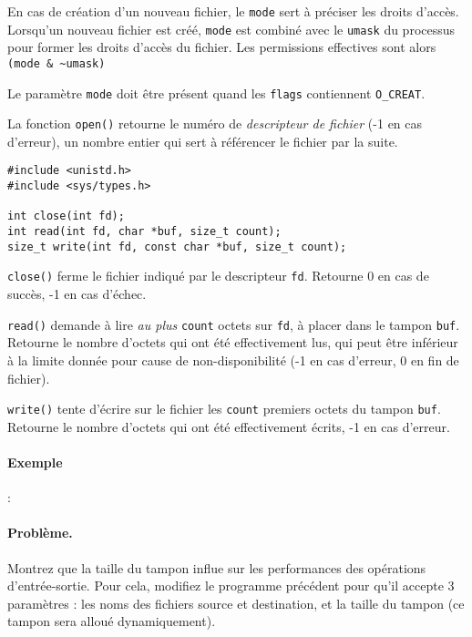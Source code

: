En cas de création d'un nouveau fichier, le \texttt{mode} sert à
préciser les droits d'accès.  Lorsqu'un nouveau fichier est créé,
\texttt{mode} est combiné avec le \texttt{umask} du processus pour
former les droits d'accès du fichier. Les permissions effectives sont
alors \verb/(mode & ~umask)/ 

Le paramètre \texttt{mode}
doit être présent quand les \texttt{flags} contiennent
\texttt{O\_CREAT}.

La fonction \texttt{open()}
retourne  le numéro de \emph{descripteur de fichier} (-1 en cas d'erreur),
un nombre entier qui sert à référencer le fichier par la suite. 



\extrait
\begin{lstlisting}
#include <unistd.h>
#include <sys/types.h>

int close(int fd);
int read(int fd, char *buf, size_t count);
size_t write(int fd, const char *buf, size_t count);
\end{lstlisting}


\texttt{close()} ferme le fichier indiqué par le descripteur
\texttt{fd}.  Retourne 0 en cas de succès, -1 en cas d'échec.

\texttt{read()} demande à lire \emph{au plus} \texttt{count} octets
sur \texttt{fd}, à placer dans le tampon \texttt{buf}. Retourne le
nombre d'octets qui ont été effectivement lus, qui peut être inférieur
à la limite donnée pour cause de non-disponibilité (-1 en cas
d'erreur, 0 en fin de fichier).

\texttt{write()} tente d'écrire sur
le fichier les \texttt{count} premiers octets du tampon
\texttt{buf}. Retourne le nombre d'octets qui ont été effectivement
écrits, -1 en cas d'erreur.

\paragraph*{Exemple} :

\source



\paragraph*{Problème.} Montrez que la taille du tampon influe sur les
performances des opérations d'entrée-sortie.  Pour cela, modifiez le
programme précédent pour qu'il accepte 3 paramètres : les noms des
fichiers source et destination, et la taille du tampon (ce tampon sera
alloué dynamiquement).


